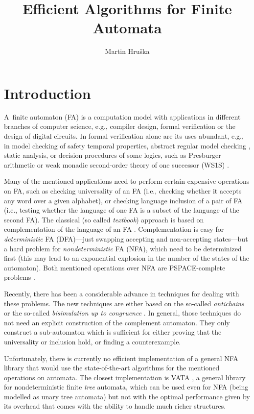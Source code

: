 \documentclass{eeict}
\title{Efficient Algorithms for Finite Automata}
\author{Martin Hruška}
\begin{document}

\maketitle

\section{Introduction}
A~finite automaton (FA) is a computation model with applications in different branches of computer science, e.g., compiler design, formal verification or 
the design of digital circuits. %
In formal verification alone are its uses abundant, 
e.g., in model checking of safety temporal properties, abstract regular model checking \cite{tacas10}, static analysis, 
or decision procedures of some logics, such as Presburger arithmetic or weak 
monadic second-order theory of one successor (WS1S) \cite{libvata}.

Many of the mentioned applications need to perform certain expensive operations on FA, such as checking universality of an FA (i.e., checking whether it
accepts any word over a given alphabet), or checking language inclusion of a pair of FA (i.e., testing whether the language of one FA is a subset of the language
of the second FA). The classical (so called \emph{textbook}) approach is based on complementation of the language of an FA \cite{cav06}. 
Complementation is easy for 
\emph{deterministic} FA (DFA)---just swapping accepting and non-accepting states---but a hard problem for \emph{nondeterministic} FA (NFA), which need 
to be determinized first (this may lead to an exponential explosion in the number of the states of the automaton). 
Both mentioned operations over NFA are PSPACE-complete problems \cite{cav06}.

Recently, there has been a considerable advance in techniques for dealing with these problems. The new techniques are either based on the so-called 
\emph{antichains} \cite{cav06,tacas10} or the so-called \emph{bisimulation up to congruence} \cite{popl13}. 
In general, those techniques do not need an explicit construction of the complement
automaton. They only construct a sub-automaton which is sufficient for either proving that the universality or inclusion hold, or finding a counterexample.

Unfortunately, there is currently no efficient implementation of a general NFA library that would use the state-of-the-art algorithms for the mentioned
operations on automata. The
closest implementation is VATA \cite{libvata}, a general library for nondeterministic finite \emph{tree} automata, which can be used even for NFA (being modelled 
as unary tree automata) but not with the optimal performance given by its overhead that comes with the ability to handle much richer structures. 
\end{document}

